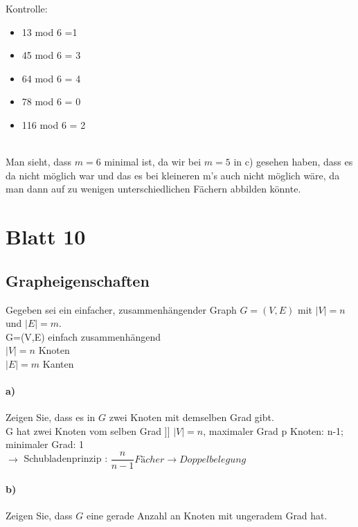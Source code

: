 \documentclass[paper=a4, fontsize=11pt]{scrartcl}
\numberwithin{equation}{section}
\numberwithin{figure}{section}
\numberwithin{table}{section}
\begin{document}
 Kontrolle:
  \begin{itemize}
 \item 13 mod 6 =1
 \item 45 mod 6 = 3
 \item 64 mod 6 = 4
 \item 78 mod 6 = 0
 \item 116 mod 6 = 2
 \end{itemize} \\
 
 Man sieht, dass $m=6$ minimal ist, da wir bei $m=5$ in c) gesehen haben, dass es da nicht möglich war und das es bei kleineren m's auch nicht möglich wäre, da man dann auf zu wenigen unterschiedlichen Fächern abbilden könnte.
 
\newpage
\section{Blatt 10}
\subsection{Grapheigenschaften}
Gegeben sei ein einfacher, zusammenhängender Graph $G=(V,E)$ mit $|V|=n$ und $|E|=m$. \\

G=(V,E) einfach zusammenhängend \\
$|V|=n$ Knoten \\
$|E|=m$ Kanten 

\paragraph{a)}
Zeigen Sie, dass es in $G$ zwei Knoten mit demselben Grad gibt. \\

G hat zwei Knoten vom selben Grad ]]
$|V| = n$, maximaler Grad p Knoten: n-1; minimaler Grad: 1 \\
$\rightarrow$ Schubladenprinzip : $\dfrac{n}{n-1} Fächer \rightarrow Doppelbelegung$

\paragraph{b)}
Zeigen Sie, dass $G$ eine gerade Anzahl an Knoten mit ungeradem Grad hat. \\
\end{document}
